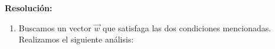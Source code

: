 \documentclass[11pt,a4paper]{article}
\newcommand{\indicador}[4]{
{\tikz[remember picture,overlay]\coordinate (#1) at #2;}{\tikz[remember picture,overlay]\coordinate (#3) at #4;} 
}
\newcommand{\marka}[2]{
{\tikz[remember picture,overlay]\coordinate (#1) at #2;}
}
\newcommand{\paralela}{\rotatebox[origin=c]{-10}{\Large$\parallel$}}
\begin{document}
\begin{enumerate}[\hspace{-5mm} 1) ]
\textbf{Resolución:}

\begin{enumerate}
    \item Buscamos un vector $\vec{w}$ que satisfaga las dos condiciones mencionadas. Realizamos el siguiente análisis:

\bigskip 




\end{enumerate}
\end{enumerate}
\end{document}
